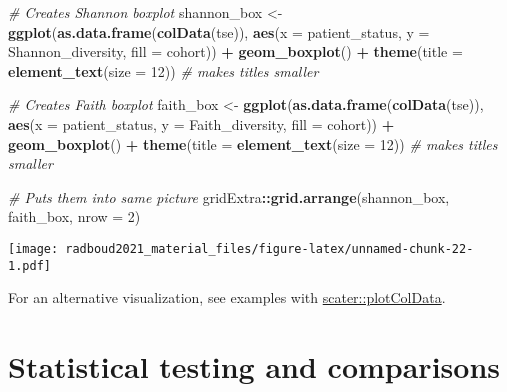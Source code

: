 \documentclass[
  oneside]{book}
\newenvironment{Shaded}{\begin{snugshade}}{\end{snugshade}}
\newcommand{\CommentTok}[1]{\textcolor[rgb]{0.56,0.35,0.01}{\textit{#1}}}
\newcommand{\DataTypeTok}[1]{\textcolor[rgb]{0.13,0.29,0.53}{#1}}
\newcommand{\DecValTok}[1]{\textcolor[rgb]{0.00,0.00,0.81}{#1}}
\newcommand{\KeywordTok}[1]{\textcolor[rgb]{0.13,0.29,0.53}{\textbf{#1}}}
\newcommand{\NormalTok}[1]{#1}
\newcommand{\OperatorTok}[1]{\textcolor[rgb]{0.81,0.36,0.00}{\textbf{#1}}}
\newcommand{\StringTok}[1]{\textcolor[rgb]{0.31,0.60,0.02}{#1}}
\begin{document}
\begin{Shaded}
\begin{Highlighting}[]
\CommentTok{# Creates Shannon boxplot }
\NormalTok{shannon_box <-}\StringTok{ }\KeywordTok{ggplot}\NormalTok{(}\KeywordTok{as.data.frame}\NormalTok{(}\KeywordTok{colData}\NormalTok{(tse)),}
  \KeywordTok{aes}\NormalTok{(}\DataTypeTok{x =}\NormalTok{ patient_status, }
      \DataTypeTok{y =}\NormalTok{ Shannon_diversity,}
      \DataTypeTok{fill =}\NormalTok{ cohort)) }\OperatorTok{+}\StringTok{ }
\StringTok{  }\KeywordTok{geom_boxplot}\NormalTok{() }\OperatorTok{+}
\StringTok{  }\KeywordTok{theme}\NormalTok{(}\DataTypeTok{title =} \KeywordTok{element_text}\NormalTok{(}\DataTypeTok{size =} \DecValTok{12}\NormalTok{)) }\CommentTok{# makes titles smaller}

\CommentTok{# Creates Faith boxplot }
\NormalTok{faith_box <-}\StringTok{ }\KeywordTok{ggplot}\NormalTok{(}\KeywordTok{as.data.frame}\NormalTok{(}\KeywordTok{colData}\NormalTok{(tse)), }\KeywordTok{aes}\NormalTok{(}\DataTypeTok{x =}\NormalTok{ patient_status, }
                                                     \DataTypeTok{y =}\NormalTok{ Faith_diversity, }
                                                     \DataTypeTok{fill =}\NormalTok{ cohort)) }\OperatorTok{+}\StringTok{ }
\StringTok{  }\KeywordTok{geom_boxplot}\NormalTok{() }\OperatorTok{+}
\StringTok{  }\KeywordTok{theme}\NormalTok{(}\DataTypeTok{title =} \KeywordTok{element_text}\NormalTok{(}\DataTypeTok{size =} \DecValTok{12}\NormalTok{)) }\CommentTok{# makes titles smaller}

\CommentTok{# Puts them into same picture}
\NormalTok{gridExtra}\OperatorTok{::}\KeywordTok{grid.arrange}\NormalTok{(shannon_box, faith_box, }\DataTypeTok{nrow =} \DecValTok{2}\NormalTok{)}
\end{Highlighting}
\end{Shaded}

\texttt{[image: radboud2021\_material\_files/figure-latex/unnamed-chunk-22-1.pdf]}

For an alternative visualization, see examples with \href{https://microbiome.github.io/OMA/microbiome-diversity.html\#alpha-diversity}{scater::plotColData}.

\hypertarget{statistical-testing-and-comparisons}{%
\section{Statistical testing and comparisons}\label{statistical-testing-and-comparisons}}
\end{document}
